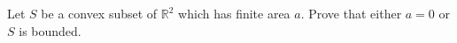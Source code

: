 Let $S$ be a convex subset of $\mathbb{R}^2$ which has finite area $a$. Prove that either $a=0$ or $S$ is bounded.